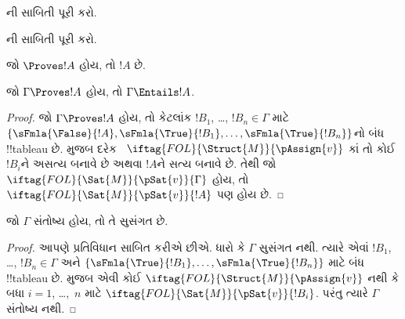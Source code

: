 \documentclass[../../../include/open-logic-section]{subfiles}
\begin{document}
\begin{prob}
ની સાબિતી પૂરી કરો.
\end{prob}
\tagendprob

\begin{prob}
ની સાબિતી પૂરી કરો.
\end{prob}
\tagendprob

\begin{cor}
જો $\Proves !A$ હોય, તો $!A$  છે.
\end{cor}

\begin{cor}
જો $\Gamma \Proves !A$ હોય, તો $\Gamma \Entails !A$.
\end{cor}

\begin{proof}
  જો $\Gamma \Proves !A$ હોય, તો કેટલાંક $!B_1$, \dots,
  $!B_n \in \Gamma$ માટે $\{\sFmla{\False}{!A},
  \sFmla{\True}{!B_1}, \dots, \sFmla{\True}{!B_n}\}$નો બંધ
  !!{tableau} છે.  મુજબ દરેક
  ~$\iftag{FOL}{\Struct{M}}{\pAssign{v}}$
  કાં તો કોઈ $!B_i$ને અસત્ય બનાવે છે અથવા $!A$ને સત્ય બનાવે છે. તેથી
  જો $\iftag{FOL}{\Sat{M}}{\pSat{v}}{\Gamma}$ હોય, તો
  $\iftag{FOL}{\Sat{M}}{\pSat{v}}{!A}$ પણ હોય છે.
\end{proof}

\begin{cor}
જો $\Gamma$ સંતોષ્ય હોય, તો તે સુસંગત છે.
\end{cor}

\begin{proof}
આપણે પ્રતિવિધાન સાબિત કરીએ છીએ. ધારો કે $\Gamma$ સુસંગત નથી. ત્યારે
એવાં $!B_1$, \dots, $!B_n \in \Gamma$ અને
$\{\sFmla{\True}{!B_1}, \dots, \sFmla{\True}{!B_n}\}$ માટે બંધ
!!{tableau} છે.  મુજબ એવી કોઈ
$\iftag{FOL}{\Struct{M}}{\pAssign{v}}$ નથી કે બધા $i=1$, \dots,~$n$
માટે $\iftag{FOL}{\Sat{M}}{\pSat{v}}{!B_i}$. પરંતુ ત્યારે $\Gamma$
સંતોષ્ય નથી.
\end{proof}
\end{document}
